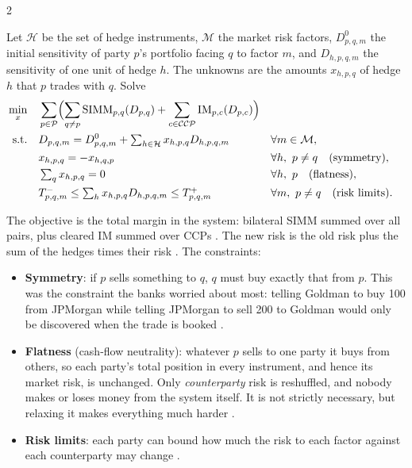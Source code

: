 \begin{paracol}{2}
\begin{definition}\label{ch08:def-mmp}
Let $\mathcal H$ be the set of hedge instruments, $\mathcal M$ the market risk factors, $D^0_{p,q,m}$ the initial
sensitivity of party $p$'s portfolio facing $q$ to factor $m$, and $D_{h,p,q,m}$ the sensitivity of one unit of hedge
$h$. The unknowns are the amounts $x_{h,p,q}$ of hedge $h$ that $p$ trades with $q$. Solve
\begin{align*}
  \min_{x}\quad & \sum_{p\in\mathcal P}\Bigl(\sum_{q\ne p}\mathrm{SIMM}_{p,q}(D_{p,q})
                   +\sum_{c\in\mathcal{CCP}}\mathrm{IM}_{p,c}(D_{p,c})\Bigr)\\
  \text{s.t.}\quad & D_{p,q,m}=D^0_{p,q,m}+\textstyle\sum_{h\in\mathcal H}x_{h,p,q}D_{h,p,q,m} && \forall m\in\mathcal M,\\
  & x_{h,p,q}=-x_{h,q,p} && \forall h,\ p\ne q \quad\text{(symmetry)},\\
  & \textstyle\sum_{q}x_{h,p,q}=0 && \forall h,\ p \quad\text{(flatness)},\\
  & T^-_{p,q,m}\le\textstyle\sum_hx_{h,p,q}D_{h,p,q,m}\le T^+_{p,q,m} && \forall m,\ p\ne q\quad\text{(risk limits)}.
\end{align*}
\end{definition}
The objective is the total margin in the system: bilateral SIMM summed over all pairs, plus cleared IM summed over
CCPs . The new risk is the old risk plus the sum of the hedges times their risk
. The constraints:
\begin{itemize}
  \item \textbf{Symmetry}: if $p$ sells something to $q$, $q$ must buy exactly that from $p$. This was the
        constraint the banks worried about most: telling Goldman to buy 100 from JPMorgan while telling JPMorgan
        to sell 200 to Goldman would only be discovered when the trade is booked .
  \item \textbf{Flatness} (cash-flow neutrality): whatever $p$ sells to one party it buys from others, so each
        party's total position in every instrument, and hence its market risk, is unchanged. Only
        \emph{counterparty} risk is reshuffled, and nobody makes or loses money from the system itself. It is not
        strictly necessary, but relaxing it makes everything much harder .
  \item \textbf{Risk limits}: each party can bound how much the risk to each factor against each counterparty may
        change .
\end{itemize}


\end{paracol}
